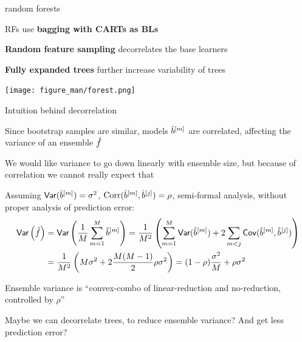 \documentclass[11pt,compress,t,notes=noshow, xcolor=table]{beamer}
\begin{document}
\begin{framei}{random forests }


\item RFs use \textbf{bagging with CARTs as BLs} %
\item \textbf{Random feature sampling} decorrelates the base learners
\item \textbf{Fully expanded trees} further increase variability of trees

\vfill

\begin{center}
\texttt{[image: figure\_man/forest.png]}
\end{center}

\end{framei}


\begin{framei}{Intuition behind decorrelation}
  \item Since bootstrap samples are similar, models $\hat{b}^{[m]}$ are correlated, affecting the variance of an ensemble $\hat{f}$
  \item We would like variance to go down linearly with ensemble size, but because of correlation we cannot really expect that
  \item Assuming $\mathsf{Var}(\hat{b}^{[m]}) = \sigma^2$, $\text{Corr}(\hat{b}^{[m]}, \hat{b}^{[j]}) = \rho$, semi-formal analysis,
    without proper analysis of prediction error:
\begin{align*}
\mathsf{Var}\left(\hat{f}\right) &= \mathsf{Var}\left(\frac{1}{M} \sum_{m=1}^{M} \hat{b}^{[m]} \right) = \frac{1}{M^2} \left( \sum_{m=1}^{M} \mathsf{Var}(\hat{b}^{[m]}) + 2 \sum_{m < j} \mathsf{Cov}(\hat{b}^{[m]}, \hat{b}^{[j]}) \right) \\
&= \frac{1}{M^2} \left( M \sigma^2 + 2 \frac{M(M-1)}{2}\rho \sigma^2 \right) = (1-\rho)\frac{\sigma^2}{M} + \rho \sigma^2
\end{align*}

\item Ensemble variance is ``convex-combo of linear-reduction and no-reduction, controlled by $\rho$''
\item Maybe we can decorrelate trees, to reduce ensemble variance? And get less prediction error?
\end{framei}
\end{document}
